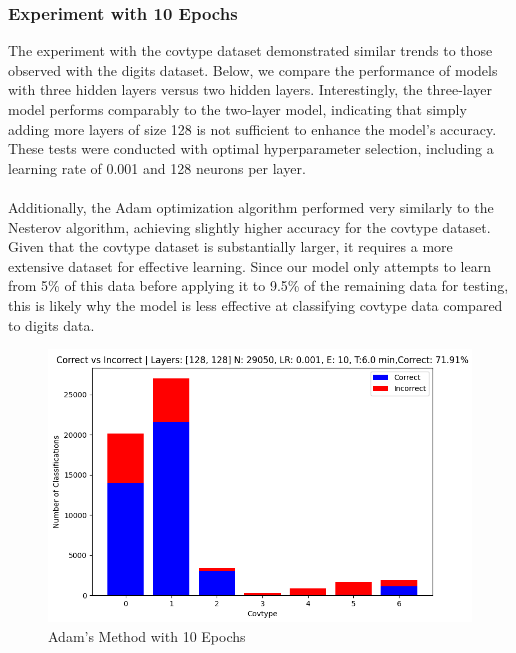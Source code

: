 \documentclass{article}
\begin{document}
\subsubsection{Experiment with 10 Epochs}

The experiment with the covtype dataset demonstrated similar trends to those observed with the digits dataset. Below, we compare the performance of models with three hidden layers versus two hidden layers. Interestingly, the three-layer model performs comparably to the two-layer model, indicating that simply adding more layers of size 128 is not sufficient to enhance the model's accuracy. These tests were conducted with optimal hyperparameter selection, including a learning rate of 0.001 and 128 neurons per layer. \\ \\
Additionally, the Adam optimization algorithm performed very similarly to the Nesterov algorithm, achieving slightly higher accuracy for the covtype dataset. Given that the covtype dataset is substantially larger, it requires a more extensive dataset for effective learning. Since our model only attempts to learn from 5\% of this data before applying it to 9.5\% of the remaining data for testing, this is likely why the model is less effective at classifying covtype data compared to digits data.

\begin{figure}[h!]
    \centering
    \includegraphics[scale=0.4]{image.png}
    \caption{Adam's Method with 10 Epochs}
    \label{fig:two-layer-adam}
\end{figure}
\end{document}
